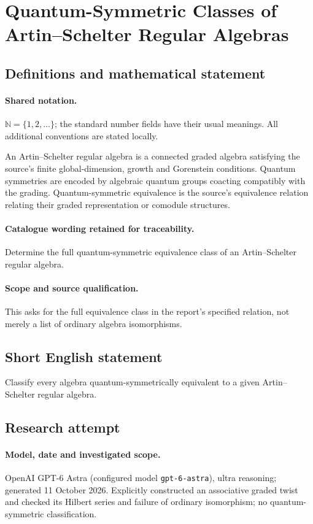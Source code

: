 \documentclass[11pt]{article}
\begin{document}
\section{Quantum-Symmetric Classes of Artin–Schelter Regular Algebras}\label{statement}

\subsection{Definitions and mathematical statement}

\paragraph{Shared notation.}$\mathbb N=\{1,2,\ldots\}$; the standard number fields have their usual meanings. All additional conventions are stated locally.


An Artin--Schelter regular algebra is a connected graded algebra satisfying the source's finite global-dimension, growth and Gorenstein conditions. Quantum symmetries are encoded by algebraic quantum groups coacting compatibly with the grading. Quantum-symmetric equivalence is the source's equivalence relation relating their graded representation or comodule structures.

\paragraph{Catalogue wording retained for traceability.}
Determine the full quantum-symmetric equivalence class of an Artin–Schelter regular algebra.

\paragraph{Scope and source qualification.}This asks for the full equivalence class in the report's specified relation, not merely a list of ordinary algebra isomorphisms.
\subsection{Short English statement}
Classify every algebra quantum-symmetrically equivalent to a given Artin--Schelter regular algebra.
\subsection{Research attempt}
\paragraph{Model, date and investigated scope.}
OpenAI GPT-6 Astra (configured model \texttt{gpt-6-astra}), ultra reasoning; generated 11 October 2026. Explicitly constructed an associative graded twist and checked its Hilbert series and failure of ordinary isomorphism; no quantum-symmetric classification.
\end{document}
